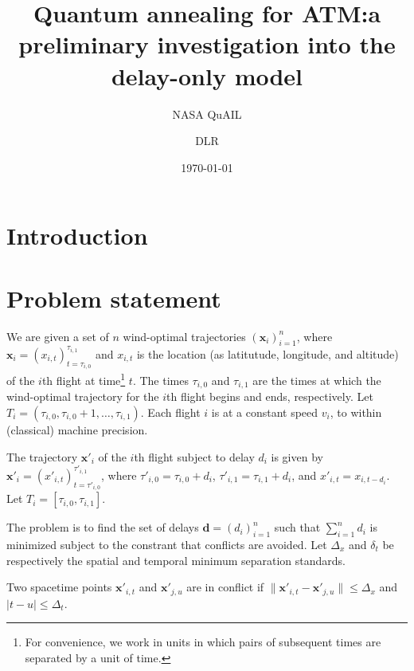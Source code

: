 \documentclass[twocolumn]{article}
\date{\today}
\author{NASA QuAIL \and DLR}
\title{Quantum annealing for ATM:\@ a preliminary investigation into the delay-only model}
\begin{document}
\maketitle

\section{Introduction}

\section{Problem statement}

We are given a set of $n$ wind-optimal trajectories 
${\left(\mathbf{x}_i\right)}_{i=1}^n$, 
where 
$\mathbf{x}_i = {\left(x_{i,t}\right)}_{t=\tau_{i,0}}^{\tau_{i,1}}$ 
and 
$x_{i, t}$ is the location (as latitutude, longitude, and altitude) of the $i$th flight at time\footnote{For convenience, we work in units in which pairs of subsequent times are separated by a unit of time.} $t$.
The times $\tau_{i,0}$ and $\tau_{i, 1}$ are the times at which the wind-optimal trajectory for the $i$th flight begins and ends, respectively.
Let $T_i = \left(\tau_{i, 0}, \tau_{i, 0} + 1, \ldots, \tau_{i, 1}\right)$.
Each flight $i$ is at a constant speed $v_i$, to within (classical) machine precision.

The trajectory $\mathbf{x}'_i$ of the $i$th flight subject to delay $d_i$ is given by
$\mathbf{x}'_i = {\left(x'_{i,t}\right)}_{t=\tau'_{i,0}}^{\tau'_{i,1}}$,
where 
$\tau'_{i,0} = \tau_{i,0} + d_i$,
$\tau'_{i,1} = \tau_{i,1} + d_i$, and
${x'}_{i,t} = x_{i, t - d_i}$.
Let $T_i = [\tau_{i, 0}, \tau_{i, 1}]$.

The problem is to find the set of delays 
$\mathbf d = {\left(d_i\right)}_{i=1}^n$ such that $\sum_{i=1}^n d_i$ is minimized subject to the constrant that conflicts are avoided.
Let $\Delta_x$ and $\delta_t$ be respectively the spatial and temporal minimum separation standards. 

Two spacetime points $\mathbf x'_{i,t}$ and $\mathbf x'_{j,u}$ are in conflict if 
$\|\mathbf x'_{i,t} - \mathbf x'_{j,u}\| \leq \Delta_x$ and $|t - u| \leq \Delta_t$.
\end{document}
